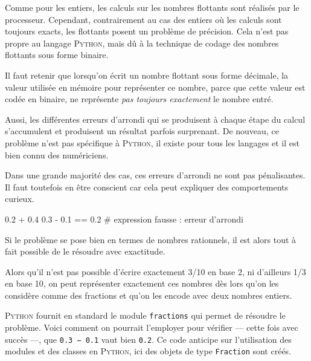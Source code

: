Comme pour les entiers, les calculs sur les nombres flottants sont réalisés par le processeur. 
Cependant, contrairement au cas des entiers où les calculs sont toujours exacts, les flottants posent un problème de précision. Cela n'est pas propre au langage \textsc{Python}, mais dû à la technique de codage des nombres flottants sous forme binaire.

Il faut retenir que lorsqu'on écrit un nombre flottant sous forme décimale, la valeur utilisée en mémoire pour représenter ce nombre, parce que cette valeur est codée en binaire, ne représente \emph{pas toujours exactement} le nombre entré.

Aussi, les différentes erreurs d'arrondi qui se produisent à chaque étape du calcul s'accumulent et produisent un résultat parfois surprenant. De nouveau, ce problème n'est pas spécifique à \textsc{Python}, il existe pour tous les langages et il est bien connu des numériciens.

Dans une grande majorité des cas, ces erreurs d'arrondi ne sont pas pénalisantes. Il faut toutefois en être conscient car cela peut expliquer des comportements curieux.

\begin{idleconsole}
	\begin{pyconsole}
		0.2 + 0.4
		0.3 - 0.1 == 0.2  # expression fausse : erreur d'arrondi
	\end{pyconsole}
\end{idleconsole}

\vspace{1pt}


Si le problème se pose bien en termes de nombres rationnels, il est alors tout à fait possible de le résoudre avec exactitude.

Alors qu'il n'est pas possible d'écrire exactement 3/10 en base 2, ni d'ailleurs 1/3 en base 10, on peut représenter exactement ces nombres dès lors qu'on les considère comme des fractions et qu'on les encode avec deux nombres entiers.

\textsc{Python} fournit en standard le module \texttt{fractions} qui permet de résoudre le problème. Voici comment on pourrait l'employer pour vérifier --- cette fois avec succès ---, que \texttt{0.3 − 0.1} vaut bien \texttt{0.2}. Ce code anticipe sur l'utilisation des modules et des classes en \textsc{Python}, ici des objets de type \texttt{Fraction} sont créés.

